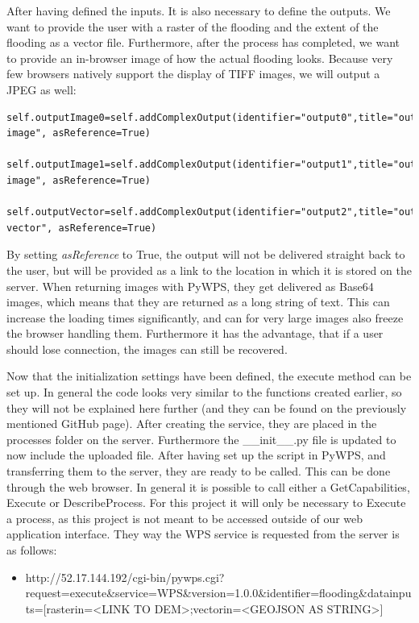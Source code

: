 After having defined the inputs. It is also necessary to define the outputs. We want to provide the user with a raster of the flooding and the extent of the flooding as a vector file. Furthermore, after the process has completed, we want to provide an in-browser image of how the actual flooding looks. Because very few browsers natively support the display of TIFF images, we will output a JPEG as well:\\


\begin{lstlisting}
self.outputImage0=self.addComplexOutput(identifier="output0",title="output image", asReference=True)

self.outputImage1=self.addComplexOutput(identifier="output1",title="output image", asReference=True)

self.outputVector=self.addComplexOutput(identifier="output2",title="output vector", asReference=True)

\end{lstlisting}

By setting \textit{asReference} to True, the output will not be delivered straight back to the user, but will be provided as a link to the location in which it is stored on the server. When returning images with PyWPS, they get delivered as Base64 images, which means that they are returned as a long string of text. This can increase the loading times significantly, and can for very large images also freeze the browser handling them. Furthermore it has the advantage, that if a user should lose connection, the images can still be recovered. 

Now that the initialization settings have been defined, the execute method can be set up. In general the code looks very similar to the functions created earlier, so they will not be explained here further (and they can be found on the previously mentioned GitHub page). 
After creating the service, they are placed in the processes folder on the server. Furthermore the \_\_init\_\_.py file is updated to now include the uploaded file. 
After having set up the script in PyWPS, and transferring them to the server, they are ready to be called. This can be done through the web browser.
In general it is possible to call either a GetCapabilities, Execute or DescribeProcess. For this project it will only be necessary to Execute a process, as this project is not meant to be accessed outside of our web application interface. 
They way the WPS service is requested from the server is as follows:

\begin{itemize}
\item http://52.17.144.192/cgi-bin/pywps.cgi?request=execute\&service=WPS\&version=1.0.0\&identifier=flooding\&datainputs=[rasterin=<LINK TO DEM>;vectorin=<GEOJSON AS STRING>]
\end{itemize}

